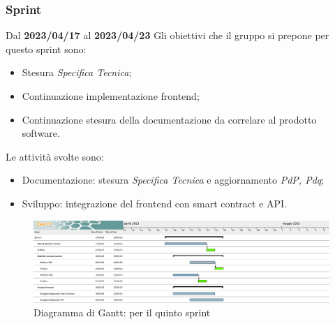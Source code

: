 \subsubsection{ Sprint}
Dal \textbf{2023/04/17} al \textbf{2023/04/23}
\newline
Gli obiettivi che il gruppo si prepone per questo sprint sono:
\begin{itemize}
    \item Stesura \textit{Specifica Tecnica};
    \item Continuazione implementazione frontend;
    \item Continuazione stesura della documentazione da correlare al prodotto software.
\end{itemize}
Le attività svolte sono:
\begin{itemize}
    \item Documentazione: stesura \textit{Specifica Tecnica} e aggiornamento \textit{PdP, Pdq};
    \item Sviluppo: integrazione del frontend con smart contract e API.
\end{itemize}
\begin{figure}[H]
    \centering
    \includegraphics[scale=0.32]{src/img/Sprint 5.png}
    \caption{Diagramma di Gantt: per il quinto sprint}
\end{figure}

